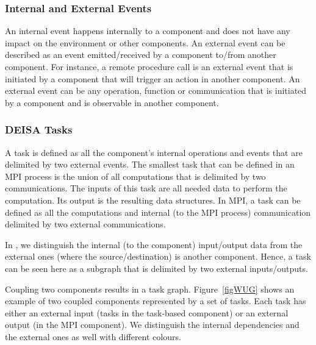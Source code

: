\subsubsection{Internal and External Events}
An internal event happens internally to a component and does not have any impact on the environment or other components.  
An external event can be described as an event emitted/received by a component to/from another component. For instance, a remote procedure call is an external event that is initiated by a component that will trigger an action in another component. An external event can be any operation, function or communication that is initiated by a component and is observable in another component.  

\subsubsection{DEISA Tasks}\label{sec:btp:task}

A task is defined as all the component's internal operations and events that are delimited by two external events. 
The smallest task that can be defined in an MPI process is the union of all computations that is delimited by two communications. The inputs of this task are all needed data to perform the computation. Its output is the resulting data structures. 
In MPI, a \deisa task can be defined as all the computations and internal (to the MPI process) communication delimited by two external communications.

In \dask, we distinguish the internal (to the component) input/output data from the external ones (where the source/destination) is another component. Hence, a \deisa task can be seen here as a \dask subgraph that is delimited by two external inputs/outputs.

Coupling two components results in a task graph. Figure~\ref{figWUG} shows an example of two coupled components represented by a set of tasks. Each task has either an external input (tasks in the task-based component) or an external output (in the MPI component). We distinguish the internal dependencies and the external ones as well with different colours.

